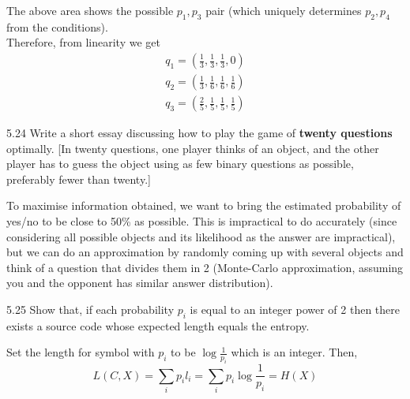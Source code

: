 \documentclass[12pt, a4paper]{article}
\begin{document}
\begin{sol}
The above area shows the possible $p_1, p_3$ pair (which uniquely determines $p_2, p_4$ from the conditions). \\
Therefore, from linearity we get \\
\begin{align*}
    q_1 = (\frac{1}{3}, \frac{1}{3}, \frac{1}{3}, 0) \\
    q_2 = (\frac{1}{3}, \frac{1}{6}, \frac{1}{6}, \frac{1}{6}) \\
    q_3 = (\frac{2}{5}, \frac{1}{5}, \frac{1}{5}, \frac{1}{5})
\end{align*}

\end{sol}
\bigskip

\begin{prob}{5.24}
    Write a short essay discussing how to play the game of \textbf{twenty questions} optimally. [In twenty questions, one player thinks of an object, and the other player has to guess the object using as few binary questions as possible, preferably fewer than twenty.]
\end{prob}
\begin{sol}
    To maximise information obtained, we want to bring the estimated probability of yes/no to be close to 50\% as possible.
    This is impractical to do accurately (since considering all possible objects and its likelihood as the answer are impractical),
    but we can do an approximation by randomly coming up with several objects and think of a question that divides them in 2 (Monte-Carlo approximation, assuming you and the opponent has similar answer distribution).
\end{sol}
\bigskip

\begin{prob}{5.25}
    Show that, if each probability $p_i$ is equal to an integer power of 2 then there exists a source code whose expected length equals the entropy.
\end{prob}
\begin{sol}
    Set the length for symbol with $p_i$ to be $\log\frac{1}{p_i}$ which is an integer. Then,
    $$L(C, X) = \sum_i p_i l_i = \sum_i p_i \log\frac{1}{p_i} = H(X) $$
\end{sol}
\bigskip
\end{document}
